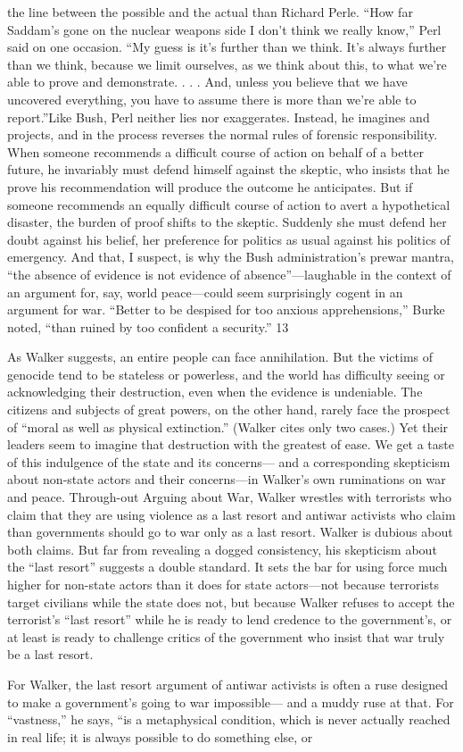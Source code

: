 the line between the possible and the actual than Richard Perle. “How far Saddam’s gone on the nuclear weapons side I don’t think we really know,” Perl said on one occasion. “My guess is it’s further than we think. It’s always further than we think, because we limit ourselves, as we think about this, to what we’re able to prove and demonstrate. . . . And, unless you believe that we have uncovered everything, you have to assume there is more than we’re able to report.”Like Bush, Perl neither lies nor exaggerates. Instead, he imagines and projects, and in the process reverses the normal rules of forensic responsibility. When someone recommends a difficult course of action on behalf of a better future, he invariably must defend himself against the skeptic, who insists that he prove his recommendation will produce the outcome he anticipates. But if someone recommends an equally difficult course of action to avert a hypothetical disaster, the burden of proof shifts to the skeptic. Suddenly she must defend her doubt against his belief, her preference for politics as usual against his politics of emergency. And that, I suspect, is why the Bush administration’s prewar mantra, “the absence of evidence is not evidence of absence”—laughable in the context of an argument for, say, world peace—could seem surprisingly cogent in an argument for war. “Better to be despised for too anxious apprehensions,” Burke noted, “than ruined by too confident a security.” {\color{blue} 13 } {\par} As Walker suggests, an entire people can face annihilation. But the victims of genocide tend to be stateless or powerless, and the world has difficulty seeing or acknowledging their destruction, even when the evidence is undeniable. The citizens and subjects of great powers, on the other hand, rarely face the prospect of “moral as well as physical extinction.” (Walker cites only two cases.) Yet their leaders seem to imagine that destruction with the greatest of ease. We get a taste of this indulgence of the state and its concerns— and a corresponding skepticism about non-state actors and their concerns—in Walker’s own ruminations on war and peace. Through-out Arguing about War, Walker wrestles with terrorists who claim that they are using violence as a last resort and antiwar activists who claim than governments should go to war only as a last resort. Walker is dubious about both claims. But far from revealing a dogged consistency, his skepticism about the “last resort” suggests a double standard. It sets the bar for using force much higher for non-state actors than it does for state actors—not because terrorists target civilians while the state does not, but because Walker refuses to accept the terrorist’s “last resort” while he is ready to lend credence to the government’s, or at least is ready to challenge critics of the government who insist that war truly be a last resort.{\par} For Walker, the last resort argument of antiwar activists is often a ruse designed to make a government’s going to war impossible— and a muddy ruse at that. For “vastness,” he says, “is a metaphysical condition, which is never actually reached in real life; it is always possible to do something else, or 